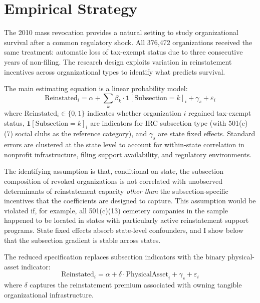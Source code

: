 \documentclass[12pt]{article}
\begin{document}


\section{Empirical Strategy}

The 2010 mass revocation provides a natural setting to study organizational survival after a common regulatory shock. All 376,472 organizations received the same treatment: automatic loss of tax-exempt status due to three consecutive years of non-filing. The research design exploits variation in reinstatement incentives across organizational types to identify what predicts survival.

The main estimating equation is a linear probability model:
\begin{equation}
\text{Reinstated}_i = \alpha + \sum_k \beta_k \cdot \mathbf{1}[\text{Subsection} = k]_i + \gamma_s + \varepsilon_i
\label{eq:main}
\end{equation}
where $\text{Reinstated}_i \in \{0, 1\}$ indicates whether organization $i$ regained tax-exempt status, $\mathbf{1}[\text{Subsection} = k]_i$ are indicators for IRC subsection type (with 501(c)(7) social clubs as the reference category), and $\gamma_s$ are state fixed effects. Standard errors are clustered at the state level to account for within-state correlation in nonprofit infrastructure, filing support availability, and regulatory environments.

The identifying assumption is that, conditional on state, the subsection composition of revoked organizations is not correlated with unobserved determinants of reinstatement capacity \textit{other than} the subsection-specific incentives that the coefficients are designed to capture. This assumption would be violated if, for example, all 501(c)(13) cemetery companies in the sample happened to be located in states with particularly active reinstatement support programs. State fixed effects absorb state-level confounders, and I show below that the subsection gradient is stable across states.

The reduced specification replaces subsection indicators with the binary physical-asset indicator:
\begin{equation}
\text{Reinstated}_i = \alpha + \delta \cdot \text{PhysicalAsset}_i + \gamma_s + \varepsilon_i
\label{eq:asset}
\end{equation}
where $\delta$ captures the reinstatement premium associated with owning tangible organizational infrastructure.
\end{document}
